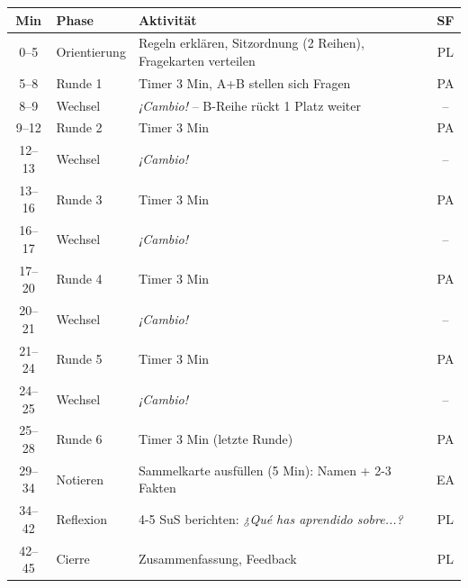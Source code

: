 \documentclass[11pt, a4paper]{article}
\begin{document}
\renewcommand{\arraystretch}{1.3}
\begin{tabularx}{\textwidth}{|c|l|X|c|}
\hline
\rowcolor{alternativeB!20}
\textbf{Min} & \textbf{Phase} & \textbf{Aktivität} & \textbf{SF} \\
\hline
0--5 & Orientierung & Regeln erklären, Sitzordnung (2 Reihen), Fragekarten verteilen & PL \\
\hline
\rowcolor{hellgrau}
5--8 & Runde 1 & Timer 3 Min, A+B stellen sich Fragen & PA \\
\hline
8--9 & Wechsel & \textcolor{spanisch}{\textit{¡Cambio!}} -- B-Reihe rückt 1 Platz weiter & -- \\
\hline
\rowcolor{hellgrau}
9--12 & Runde 2 & Timer 3 Min & PA \\
\hline
12--13 & Wechsel & \textcolor{spanisch}{\textit{¡Cambio!}} & -- \\
\hline
\rowcolor{hellgrau}
13--16 & Runde 3 & Timer 3 Min & PA \\
\hline
16--17 & Wechsel & \textcolor{spanisch}{\textit{¡Cambio!}} & -- \\
\hline
\rowcolor{hellgrau}
17--20 & Runde 4 & Timer 3 Min & PA \\
\hline
20--21 & Wechsel & \textcolor{spanisch}{\textit{¡Cambio!}} & -- \\
\hline
\rowcolor{hellgrau}
21--24 & Runde 5 & Timer 3 Min & PA \\
\hline
24--25 & Wechsel & \textcolor{spanisch}{\textit{¡Cambio!}} & -- \\
\hline
\rowcolor{hellgrau}
25--28 & Runde 6 & Timer 3 Min (letzte Runde) & PA \\
\hline
29--34 & Notieren & Sammelkarte ausfüllen (5 Min): Namen + 2-3 Fakten & EA \\
\hline
34--42 & Reflexion & 4-5 SuS berichten: \textcolor{spanisch}{\textit{¿Qué has aprendido sobre...?}} & PL \\
\hline
42--45 & Cierre & Zusammenfassung, Feedback & PL \\
\hline
\end{tabularx}

\vspace{0.4cm}
\end{document}
